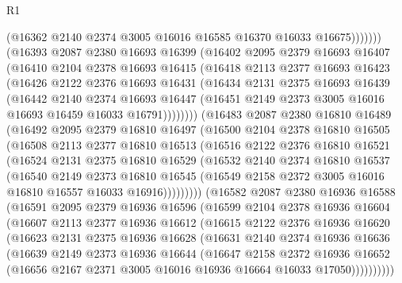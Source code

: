 \begin{lexlean}{R1}
\begin{coremodule}
                (@16362 @2140 @2374 @3005 @16016 @16585 @16370 @16033 @16675)))))))
    (@16393
      @2087
      @2380
      @16693
      @16399
      (@16402
        @2095
        @2379
        @16693
        @16407
        (@16410
          @2104
          @2378
          @16693
          @16415
          (@16418
            @2113
            @2377
            @16693
            @16423
            (@16426
              @2122
              @2376
              @16693
              @16431
              (@16434
                @2131
                @2375
                @16693
                @16439
                (@16442
                  @2140
                  @2374
                  @16693
                  @16447
                  (@16451 @2149 @2373 @3005 @16016 @16693 @16459 @16033 @16791))))))))
    (@16483
      @2087
      @2380
      @16810
      @16489
      (@16492
        @2095
        @2379
        @16810
        @16497
        (@16500
          @2104
          @2378
          @16810
          @16505
          (@16508
            @2113
            @2377
            @16810
            @16513
            (@16516
              @2122
              @2376
              @16810
              @16521
              (@16524
                @2131
                @2375
                @16810
                @16529
                (@16532
                  @2140
                  @2374
                  @16810
                  @16537
                  (@16540
                    @2149
                    @2373
                    @16810
                    @16545
                    (@16549 @2158 @2372 @3005 @16016 @16810 @16557 @16033 @16916)))))))))
    (@16582
      @2087
      @2380
      @16936
      @16588
      (@16591
        @2095
        @2379
        @16936
        @16596
        (@16599
          @2104
          @2378
          @16936
          @16604
          (@16607
            @2113
            @2377
            @16936
            @16612
            (@16615
              @2122
              @2376
              @16936
              @16620
              (@16623
                @2131
                @2375
                @16936
                @16628
                (@16631
                  @2140
                  @2374
                  @16936
                  @16636
                  (@16639
                    @2149
                    @2373
                    @16936
                    @16644
                    (@16647
                      @2158
                      @2372
                      @16936
                      @16652
                      (@16656 @2167 @2371 @3005 @16016 @16936 @16664 @16033 @17050))))))))))

\end{coremodule}
\end{lexlean}
